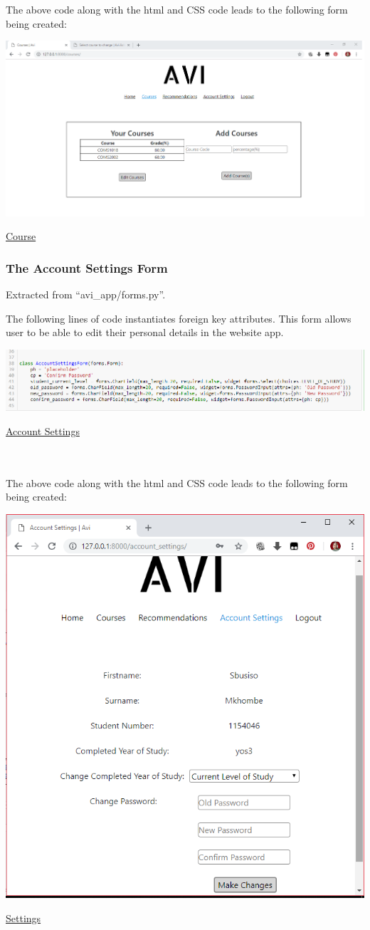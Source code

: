 \documentclass[10pt]{article}
\begin{document}
The above code along with the html and CSS code leads to the following form being created:

\begin{center}
\includegraphics[width=.9\textwidth]{course.png}
\end{center}
\caption{\underline{Course}}

\subsubsection{The  Account Settings Form}

Extracted from “avi\_app/forms.py”.

The following lines of code instantiates foreign key attributes. This form allows user to be able to edit their personal details in the website app.

\begin{center}
\includegraphics[width=.9\textwidth]{Aform.png}
\end{center}
\caption{\underline{Account Settings}} \\ \\

The above code along with the html and CSS code leads to the following form being created:

\begin{center}
\includegraphics[width=.4\textwidth]{settings.png}
\end{center}
\caption{\underline{Settings}}
\end{document}

